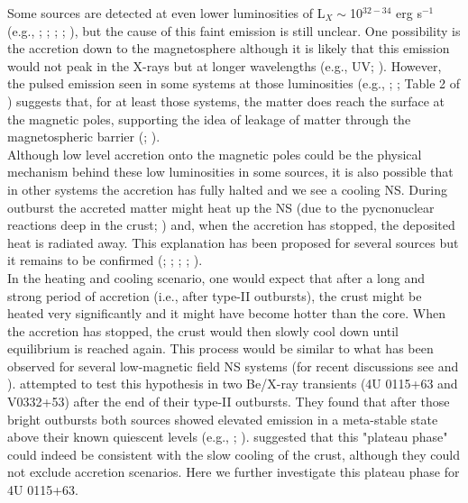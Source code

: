 \documentclass[a4paper,fleqn,usenatbib]{mnras}
\begin{document}
\indent Some sources are detected at even lower luminosities of L$_{X}\sim$10$^{32-34}$ erg s$^{-1}$ (e.g., \citealt{Mereghetti1987}; \citealt{Roberts2001}; \citealt{Campana2002}; \citealt{Reig2014}; \citealt{Elshamouty2016}), but the cause of this faint emission is still unclear. One possibility is the accretion down to the magnetosphere although it is likely that this emission would not peak in the X-rays but at longer wavelengths (e.g., UV; \citealt{Tsygankov2016}). However, the pulsed emission seen in some systems at those luminosities (e.g., \citealt{Rothschild2013}; \citealt{ Doroshenko2014}; Table 2 of \citealt{Reig2014}) suggests that, for at least those systems, the matter does reach the surface at the magnetic poles, supporting the idea of leakage of matter through the magnetospheric barrier (\citealt{Orlandini2004}; \citealt{Mukherjee2005}).\\
\indent Although low level accretion onto the magnetic poles could be the physical mechanism behind these low luminosities in some sources, it is also possible that in other systems the accretion has fully halted and we see a cooling NS. During outburst the accreted matter might heat up the NS (due to the pycnonuclear reactions deep in the crust; \citealt{Brown1998}) and, when the accretion has stopped, the deposited heat is radiated away. This explanation has been proposed for several sources but it remains to be confirmed  (\citealt{Campana2002}; \citealt{Wijnands2013}; \citealt{Reig2014}; \citealt{Elshamouty2016}; \citealt{Tsygankov2017b}).\\
\indent In the heating and cooling scenario, one would expect that after a long and strong period of accretion (i.e., after type-II outbursts), the crust might be heated very significantly and it might have become hotter than the core. When the accretion has stopped, the crust would then slowly cool down until equilibrium is reached again. This process would be similar to what has been observed for several low-magnetic field NS systems (for recent discussions see \citealt{Degenaar2015} and \citealt{Parikh2017}). \cite{Wijnands2016} attempted to test this hypothesis in two Be/X-ray transients (4U 0115+63 and V0332+53) after the end of their type-II outbursts. They found that after those bright outbursts both sources showed elevated emission in a meta-stable state above their known quiescent levels (e.g., \citealt{Elshamouty2016}; \citealt{Tsygankov2017b}). \cite{Wijnands2016} suggested that this "plateau phase" could indeed be consistent with the slow cooling of the crust, although they could not exclude accretion scenarios. Here we further investigate this plateau phase for 4U 0115+63.\\
\end{document}
